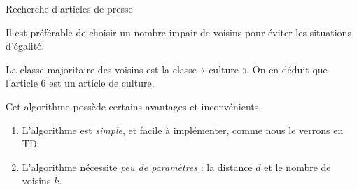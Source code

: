 \documentclass[12pt,fancy]{cours}
\begin{document}
\begin{exemple}{Recherche d'articles de presse}
{\begin{quest}
\begin{center}
            \end{center}
            Il est préférable de choisir un nombre impair de voisins pour éviter les situations d'égalité.
            \item La classe majoritaire des voisins est la classe « culture ». On en déduit que l'article 6 est un article de culture.
        \end{quest}
    }
\end{exemple}



 Cet algorithme possède certains avantages et inconvénients.
\begin{enumerate}
    \item L’algorithme est \emph{simple}, et facile à implémenter, comme nous le verrons en TD.
    \item L'algorithme nécessite \emph{peu de paramètres} : la distance $d$ et le nombre de voisins $k$.
\end{enumerate}
\end{document}

